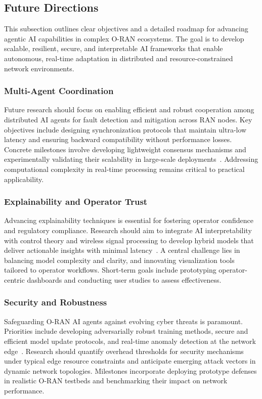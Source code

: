 \documentclass[sigconf]{acmart}
\begin{document}
\subsection{Future Directions}

This subsection outlines clear objectives and a detailed roadmap for advancing agentic AI capabilities in complex O-RAN ecosystems. The goal is to develop scalable, resilient, secure, and interpretable AI frameworks that enable autonomous, real-time adaptation in distributed and resource-constrained network environments.

\subsubsection{Multi-Agent Coordination}
Future research should focus on enabling efficient and robust cooperation among distributed AI agents for fault detection and mitigation across RAN nodes. Key objectives include designing synchronization protocols that maintain ultra-low latency and ensuring backward compatibility without performance losses. Concrete milestones involve developing lightweight consensus mechanisms and experimentally validating their scalability in large-scale deployments~\cite{ref21}. Addressing computational complexity in real-time processing remains critical to practical applicability.

\subsubsection{Explainability and Operator Trust}
Advancing explainability techniques is essential for fostering operator confidence and regulatory compliance. Research should aim to integrate AI interpretability with control theory and wireless signal processing to develop hybrid models that deliver actionable insights with minimal latency~\cite{ref48}. A central challenge lies in balancing model complexity and clarity, and innovating visualization tools tailored to operator workflows. Short-term goals include prototyping operator-centric dashboards and conducting user studies to assess effectiveness.

\subsubsection{Security and Robustness}
Safeguarding O-RAN AI agents against evolving cyber threats is paramount. Priorities include developing adversarially robust training methods, secure and efficient model update protocols, and real-time anomaly detection at the network edge~\cite{ref50}. Research should quantify overhead thresholds for security mechanisms under typical edge resource constraints and anticipate emerging attack vectors in dynamic network topologies. Milestones incorporate deploying prototype defenses in realistic O-RAN testbeds and benchmarking their impact on network performance.
\end{document}
